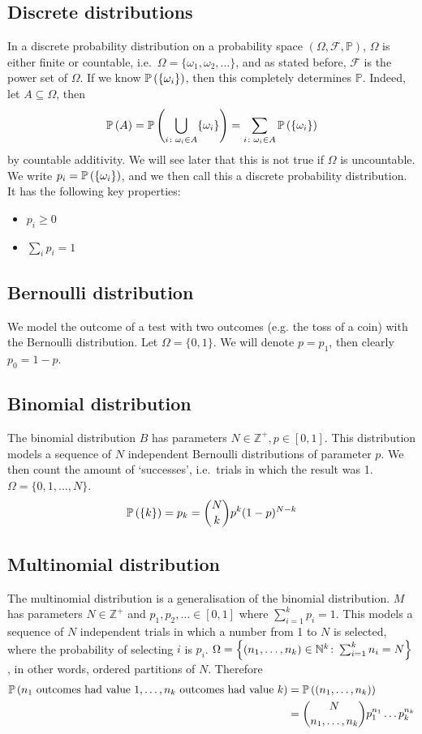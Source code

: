 \subsection{Discrete distributions}
In a discrete probability distribution on a probability space \((\Omega, \mathcal F, \mathbb P)\), \(\Omega\) is either finite or countable, i.e.\ \(\Omega = \{ \omega_1, \omega_2, \dots \}\), and as stated before, \(\mathcal F\) is the power set of \(\Omega\).
If we know \(\mathbb{P}\left({\{\omega_i\}}\right)\), then this completely determines \(\mathbb P\).
Indeed, let \(A \subseteq \Omega\), then
\[
	\mathbb{P}\left({A}\right) = \mathbb{P}\left({\bigcup_{i \colon \omega_i \in A} \{ \omega_i \}}\right) = \sum_{i \colon \omega_i \in A}\mathbb{P}\left({\{\omega_i\}}\right)
\]
by countable additivity.
We will see later that this is not true if \(\Omega\) is uncountable.
We write \(p_i = \mathbb{P}\left({\{\omega_i\}}\right)\), and we then call this a discrete probability distribution.
It has the following key properties:
\begin{itemize}
	\item \(p_i \geq 0\)
	\item \(\sum_i p_i = 1\)
\end{itemize}

\subsection{Bernoulli distribution}
We model the outcome of a test with two outcomes (e.g.
the toss of a coin) with the Bernoulli distribution.
Let \(\Omega = \{ 0, 1 \}\).
We will denote \(p = p_1\), then clearly \(p_0 = 1 - p\).

\subsection{Binomial distribution}
The binomial distribution \(B\) has parameters \(N \in \mathbb Z^+, p \in [0, 1]\).
This distribution models a sequence of \(N\) independent Bernoulli distributions of parameter \(p\).
We then count the amount of `successes', i.e.\ trials in which the result was 1.
\(\Omega = \{ 0, 1, \dots, N \}\).
\[
	\mathbb{P}\left({\{ k \}}\right) = p_k = \binom{N}{k}p^k(1-p)^{N-k}
\]

\subsection{Multinomial distribution}
The multinomial distribution is a generalisation of the binomial distribution.
\(M\) has parameters \(N \in \mathbb Z^+\) and \(p_1, p_2, \dots \in [0, 1]\) where \(\sum_{i=1}^k p_i = 1\).
This models a sequence of \(N\) independent trials in which a number from 1 to \(N\) is selected, where the probability of selecting \(i\) is \(p_i\).
\(\Omega = \qty{ (n_1, \dots, n_k) \in \mathbb N^k \colon \sum_{i=1}^k n_i = N }\), in other words, ordered partitions of \(N\).
Therefore
\begin{align*}
	\mathbb{P}\left({n_1 \text{ outcomes had value 1}, \dots, n_k \text{ outcomes had value }k}\right) &= \mathbb{P}\left({(n_1, \dots, n_k)}\right) \\
	&= \binom{N}{n_1,\dots,n_k}p_1^{n_1}\dots p_k^{n_k}
\end{align*}

